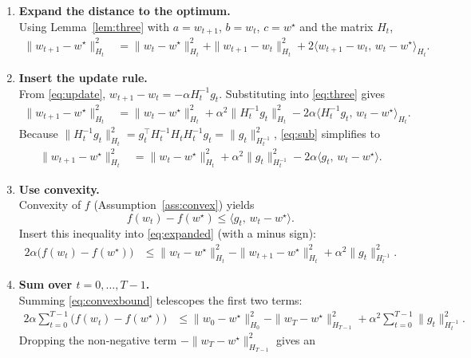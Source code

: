 \documentclass{article}
\begin{document}
\begin{enumerate}
\item[Step 1.] \textbf{Expand the distance to the optimum.}\\
Using Lemma~\ref{lem:three} with $a=w_{t+1}$, $b=w_t$, $c=w^{\star}$
and the matrix $H_t$,
\begin{align}
\|w_{t+1}-w^{\star}\|_{H_t}^2
&= \|w_t-w^{\star}\|_{H_t}^2
   +\|w_{t+1}-w_t\|_{H_t}^2
   +2\langle w_{t+1}-w_t,\,w_t-w^{\star}\rangle_{H_t}.
   \label{eq:three}
\end{align}
\item[Step 2.] \textbf{Insert the update rule.}\\
From \eqref{eq:update},
$w_{t+1}-w_t = -\alpha H_t^{-1} g_t$. Substituting into
\eqref{eq:three} gives
\begin{align}
\|w_{t+1}-w^{\star}\|_{H_t}^2
&= \|w_t-w^{\star}\|_{H_t}^2
   +\alpha^2\|H_t^{-1}g_t\|_{H_t}^2
   -2\alpha\langle H_t^{-1}g_t,\,w_t-w^{\star}\rangle_{H_t}.
   \label{eq:sub}
\end{align}
Because $\|H_t^{-1}g_t\|_{H_t}^2
      = g_t^{\!\top}H_t^{-1}H_t H_t^{-1}g_t
      = \|g_t\|_{H_t^{-1}}^2$,
\eqref{eq:sub} simplifies to
\begin{align}
\|w_{t+1}-w^{\star}\|_{H_t}^2
&= \|w_t-w^{\star}\|_{H_t}^2
   +\alpha^2\|g_t\|_{H_t^{-1}}^2
   -2\alpha\langle g_t,\,w_t-w^{\star}\rangle .
   \label{eq:expanded}
\end{align}
\item[Step 3.] \textbf{Use convexity.}\\
Convexity of $f$ (Assumption~\ref{ass:convex}) yields
\[
   f(w_t)-f(w^{\star})\le \langle g_t,\,w_t-w^{\star}\rangle .
   \tag{Convexity}
\]
Insert this inequality into \eqref{eq:expanded} (with a minus sign):
\begin{align}
2\alpha\bigl(f(w_t)-f(w^{\star})\bigr)
&\le  \|w_t-w^{\star}\|_{H_t}^2
      -\|w_{t+1}-w^{\star}\|_{H_t}^2
      +\alpha^2\|g_t\|_{H_t^{-1}}^2 .
      \label{eq:convexbound}
\end{align}
\item[Step 4.] \textbf{Sum over $t=0,\dots,T-1$.}\\
Summing \eqref{eq:convexbound} telescopes the first two terms:
\begin{align}
2\alpha\sum_{t=0}^{T-1}\bigl(f(w_t)-f(w^{\star})\bigr)
&\le \|w_0-w^{\star}\|_{H_0}^2
     -\|w_T-w^{\star}\|_{H_{T-1}}^2
     +\alpha^2\sum_{t=0}^{T-1}\|g_t\|_{H_t^{-1}}^2 .
     \label{eq:telescoped}
\end{align}
Dropping the non‑negative term $-\|w_T-w^{\star}\|_{H_{T-1}}^2$ gives an

\end{enumerate}
\end{document}
